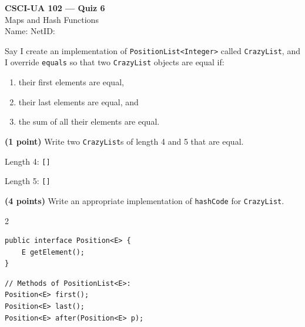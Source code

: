\documentclass[11pt]{article}
\begin{document}
\begin{center}
  {\Large \textbf{CSCI-UA 102 --- Quiz 6}} \\[4pt]
  {\large Maps and Hash Functions} \\[3pt]
  Name: \underline{\hspace{2.5in}} \quad NetID: \underline{\hspace{1.5in}}
\end{center}

\medskip

\noindent Say I create an implementation of \texttt{PositionList<Integer>} called
\texttt{CrazyList}, and I override \texttt{equals} so that two \texttt{CrazyList}
objects are equal if:
\begin{enumerate}[nosep]
  \item their first elements are equal,
  \item their last elements are equal, and
  \item the sum of all their elements are equal.
\end{enumerate}

\medskip

\noindent\textbf{(1 point)} Write two \texttt{CrazyList}s of length 4 and 5 that are equal.

\bigskip

Length 4: \texttt{[}\underline{\hspace{3.5in}}\texttt{]}

\medskip

Length 5: \texttt{[}\underline{\hspace{3.5in}}\texttt{]}

\bigskip

\noindent\textbf{(4 points)} Write an appropriate implementation of \texttt{hashCode} for \texttt{CrazyList}.

\medskip

\vspace{-0.5em}
\begin{multicols}{2}
\begin{lstlisting}[basicstyle=\ttfamily\scriptsize, aboveskip=3pt, belowskip=3pt]
public interface Position<E> {
    E getElement();
}
\end{lstlisting}
\columnbreak
\begin{lstlisting}[basicstyle=\ttfamily\scriptsize, aboveskip=3pt, belowskip=3pt]
// Methods of PositionList<E>:
Position<E> first();
Position<E> last();
Position<E> after(Position<E> p);
\end{lstlisting}
\end{multicols}
\end{document}
